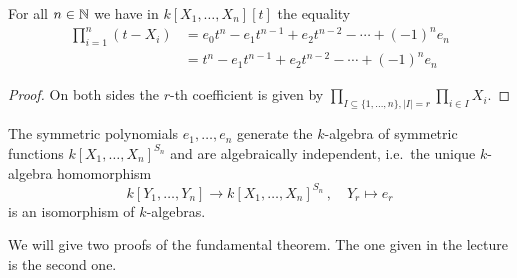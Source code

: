 \begin{lemma}
  \label{lemma: natural occurence of elementary symmetric polynomials}
  For all $n \in \mathbb{N}$ we have in $k[X_1, \dotsc, X_n][t]$ the equality
  \begin{align*}
        \prod_{i=1}^n (t-X_i)
    &=    e_0 t^n
        - e_1 t^{n-1}
        + e_2 t^{n-2}
        - \dotsb
        + (-1)^n e_n  \\
    &=    t^n
        - e_1 t^{n-1}
        + e_2 t^{n-2}
        - \dotsb
        + (-1)^n e_n
  \end{align*}
\end{lemma}
\begin{proof}
  On both sides the $r$-th coefficient is given by $\prod_{I \subseteq \{1, \dotsc, n\}, |I| = r} \prod_{i \in I} X_i $.
\end{proof}


\begin{theorem}
  \label{theorem: fundamental theorem of symmetric functions}
  The symmetric polynomials $e_1, \dotsc, e_n$ generate the $k$-algebra of symmetric functions $k[X_1, \dotsc, X_n]^{S_n}$ and are algebraically independent, i.e.\ the unique $k$-algebra homomorphism
  \[
            k[Y_1, \dotsc, Y_n]
    \to     k[X_1, \dotsc, X_n]^{S_n} \,,
    \quad   Y_r
    \mapsto e_r
  \]
  is an isomorphism of $k$-algebras.
\end{theorem}


\begin{fluff}
  We will give two proofs of the fundamental theorem.
  The one given in the lecture is the second one.
\end{fluff}


